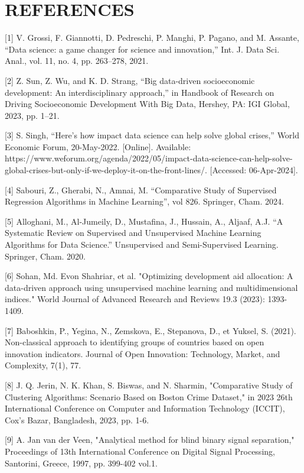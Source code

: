 \documentclass{article}
\begin{document}
\section{REFERENCES}
\begin{multicols}{2}

[1] V. Grossi, F. Giannotti, D. Pedreschi, P. Manghi, P. Pagano, and M. Assante, “Data science: a game changer for science and innovation,” Int. J. Data Sci. Anal., vol. 11, no. 4, pp. 263–278, 2021.

[2] Z. Sun, Z. Wu, and K. D. Strang, “Big data-driven socioeconomic development: An interdisciplinary approach,” in Handbook of Research on Driving Socioeconomic Development With Big Data, Hershey, PA: IGI Global, 2023, pp. 1–21.

[3] S. Singh, “Here’s how impact data science can help solve global crises,” World Economic Forum, 20-May-2022. [Online]. Available: https://www.weforum.org/agenda/2022/05/impact-data-science-can-help-solve-global-crises-but-only-if-we-deploy-it-on-the-front-lines/. [Accessed: 06-Apr-2024]. 

[4] Sabouri, Z., Gherabi, N., Amnai, M. “Comparative Study of Supervised Regression Algorithms in Machine Learning”, vol 826. Springer, Cham. 2024. 

[5] Alloghani, M., Al-Jumeily, D., Mustafina, J., Hussain, A., Aljaaf, A.J. “A Systematic Review on Supervised and Unsupervised Machine Learning Algorithms for Data Science.”  Unsupervised and Semi-Supervised Learning. Springer, Cham. 2020.

[6] Sohan, Md. Evon Shahriar, et al. "Optimizing development aid allocation: A data-driven approach using unsupervised machine learning and multidimensional indices." World Journal of Advanced Research and Reviews 19.3 (2023): 1393-1409.

[7] Baboshkin, P., Yegina, N., Zemskova, E., Stepanova, D., et Yuksel, S. (2021). Non-classical approach to identifying groups of countries based on open innovation indicators.  Journal of Open Innovation: Technology, Market, and Complexity, 7(1), 77.

[8] J. Q. Jerin, N. K. Khan, S. Biswas, and N. Sharmin, "Comparative Study of Clustering Algorithms: Scenario Based on Boston Crime Dataset," in 2023 26th International Conference on Computer and Information Technology (ICCIT), Cox's Bazar, Bangladesh, 2023, pp. 1-6. 

[9] A. Jan van der Veen, "Analytical method for blind binary signal separation," Proceedings of 13th International Conference on Digital Signal Processing, Santorini, Greece, 1997, pp. 399-402 vol.1. 


\end{multicols}
\end{document}
